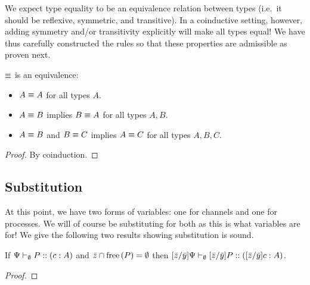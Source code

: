 We expect type equality to be an equivalence relation between types (i.e.\ it should be reflexive, symmetric, and transitive). In a coinductive setting, however, adding symmetry and/or transitivity explicitly will make all types equal! We have thus carefully constructed the rules so that these properties are admissible as proven next.


\begin{theorem}
  \label{eq-is-equivalence}
  $\equiv$ is an equivalence:
  \begin{itemize}
    \item $A \equiv A$ for all types $A.$
    \item $A \equiv B$ implies $B \equiv A$ for all types $A, B$.
    \item $A \equiv B$ and $B \equiv C$ implies $A \equiv C$ for all types $A, B, C$.
  \end{itemize}
\end{theorem}

\begin{proof}
  By coinduction. 
\end{proof}


\subsection{Substitution}

At this point, we have two forms of variables: one for channels and one for processes. We will of course be substituting for both as this is what variables are for! We give the following two results showing substitution is sound.

\begin{lemma}
  \label{channel-substitution}
  If ${\Psi} \vdash_{\emptyset} P :: (c : A)$ and $\bar{z} \cap \operatorname{free} {(P)} = \emptyset$ then ${\lbrack{\bar{z}}/{\bar{y}}\rbrack{\Psi}} \vdash_{\emptyset} \lbrack{\bar{z}}/{\bar{y}}\rbrack{P} :: (\lbrack{\bar{z}}/{\bar{y}}\rbrack{c} : A)$.
\end{lemma}
\begin{proof}
\end{proof}

\begin{lemma}
\end{lemma}

